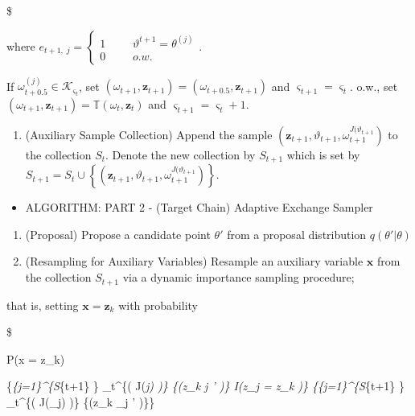 \documentclass[
]{book}
\providecommand{\tightlist}{%
  \setlength{\itemsep}{0pt}\setlength{\parskip}{0pt}}
\begin{document}
\$

where \(e_{t+1, \; j} = \begin{cases} 1 & && \vartheta^{t+1} = \theta^{(j)} \\ 0 & && o.w. \end{cases}\).

If \(\omega_{t+0.5}^{(j)} \in \mathcal{K}_{\varsigma_t}\), set \((\omega_{t+1}, \pmb z_{t+1}) = (\omega_{t+0.5}, \pmb z_{t+1})\) and \(\varsigma_{t+1} = \varsigma_t\).
o.w., set \((\omega_{t+1}, \pmb z_{t+1}) = \mathbb{T}(\omega_{t}, \pmb z_{t})\) and \(\varsigma_{t+1} = \varsigma_t + 1\).

\begin{enumerate}
\def\labelenumi{\arabic{enumi}.}
\setcounter{enumi}{2}
\tightlist
\item
  (Auxiliary Sample Collection) Append the sample \(\left(\pmb z_{t+1} , \vartheta_{t+1}, \omega_{t+1}^{J(\vartheta_{t+1}} \right)\) to the collection \(S_t\). Denote the new collection by \(S_{t+1}\) which is set by \(S_{t+1} = S_t \cup \left\{ \left(\pmb z_{t+1} , \vartheta_{t+1}, \omega_{t+1}^{J(\vartheta_{t+1}} \right) \right\}\).
\end{enumerate}

\begin{itemize}
\tightlist
\item
  ALGORITHM: PART 2 - (Target Chain) Adaptive Exchange Sampler
\end{itemize}

\begin{enumerate}
\def\labelenumi{\arabic{enumi}.}
\item
  (Proposal) Propose a candidate point \(\theta '\) from a proposal distribution \(q(\theta ' \vert \theta)\)
\item
  (Resampling for Auxiliary Variables) Resample an auxiliary variable \(\pmb x\) from the collection \(S_{t+1}\) via a dynamic importance sampling procedure;
\end{enumerate}

that is, setting \(\pmb x = \pmb z_k\) with probability

\$

P(\pmb x = \pmb z\_k)

\dfrac

\{\sum\emph{\{j=1\}\^{}\{\vert S}\{t+1\} \vert\} \omega\_t\^{}\{\left( J(\vartheta\emph{j) \right)\}  \{\varphi(\pmb z\_k \vert \vartheta\emph{j ' )\} \ast I(\pmb z\_j = \pmb z\_k )\}
\{\sum}\{j=1\}\^{}\{\vert S}\{t+1\} \vert\} \omega\_t\^{}\{\left( J(\vartheta\_j) \right)\}  \{\varphi(\pmb z\_k \vert \vartheta\_j ' )\}\}
\end{document}
